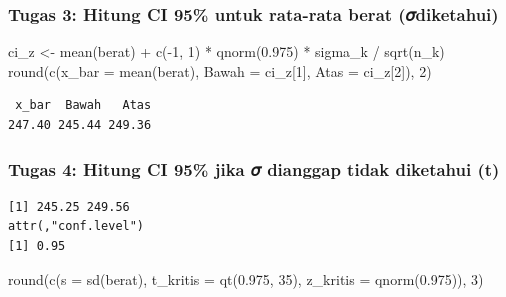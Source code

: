 \documentclass[
  indonesian,
  letterpaper,
]{book}
\newenvironment{Shaded}{\begin{snugshade}}{\end{snugshade}}
\newcommand{\AttributeTok}[1]{\textcolor[rgb]{0.40,0.45,0.13}{#1}}
\newcommand{\DecValTok}[1]{\textcolor[rgb]{0.68,0.00,0.00}{#1}}
\newcommand{\FloatTok}[1]{\textcolor[rgb]{0.68,0.00,0.00}{#1}}
\newcommand{\FunctionTok}[1]{\textcolor[rgb]{0.28,0.35,0.67}{#1}}
\newcommand{\NormalTok}[1]{\textcolor[rgb]{0.00,0.23,0.31}{#1}}
\newcommand{\OtherTok}[1]{\textcolor[rgb]{0.00,0.23,0.31}{#1}}
\newcommand{\SpecialCharTok}[1]{\textcolor[rgb]{0.37,0.37,0.37}{#1}}
\begin{document}
\subsubsection{Tugas 3: Hitung CI 95\% untuk rata-rata berat
(𝜎diketahui)}\label{tugas-3-hitung-ci-95-untuk-rata-rata-berat-ux1d70ediketahui}

\begin{Shaded}
\begin{Highlighting}[]
\NormalTok{ci\_z }\OtherTok{\textless{}{-}} \FunctionTok{mean}\NormalTok{(berat) }\SpecialCharTok{+} \FunctionTok{c}\NormalTok{(}\SpecialCharTok{{-}}\DecValTok{1}\NormalTok{, }\DecValTok{1}\NormalTok{) }\SpecialCharTok{*} \FunctionTok{qnorm}\NormalTok{(}\FloatTok{0.975}\NormalTok{) }\SpecialCharTok{*}\NormalTok{ sigma\_k }\SpecialCharTok{/} \FunctionTok{sqrt}\NormalTok{(n\_k)}
\FunctionTok{round}\NormalTok{(}\FunctionTok{c}\NormalTok{(}\AttributeTok{x\_bar =} \FunctionTok{mean}\NormalTok{(berat), }\AttributeTok{Bawah =}\NormalTok{ ci\_z[}\DecValTok{1}\NormalTok{], }\AttributeTok{Atas =}\NormalTok{ ci\_z[}\DecValTok{2}\NormalTok{]), }\DecValTok{2}\NormalTok{)}
\end{Highlighting}
\end{Shaded}

\begin{verbatim}
 x_bar  Bawah   Atas 
247.40 245.44 249.36 
\end{verbatim}

\subsubsection{Tugas 4: Hitung CI 95\% jika 𝜎 dianggap tidak diketahui
(t)}\label{tugas-4-hitung-ci-95-jika-ux1d70e-dianggap-tidak-diketahui-t}

\begin{Shaded}
\end{Shaded}

\begin{verbatim}
[1] 245.25 249.56
attr(,"conf.level")
[1] 0.95
\end{verbatim}

\begin{Shaded}
\begin{Highlighting}[]
\FunctionTok{round}\NormalTok{(}\FunctionTok{c}\NormalTok{(}\AttributeTok{s =} \FunctionTok{sd}\NormalTok{(berat), }\AttributeTok{t\_kritis =} \FunctionTok{qt}\NormalTok{(}\FloatTok{0.975}\NormalTok{, }\DecValTok{35}\NormalTok{), }\AttributeTok{z\_kritis =} \FunctionTok{qnorm}\NormalTok{(}\FloatTok{0.975}\NormalTok{)), }\DecValTok{3}\NormalTok{)}
\end{Highlighting}
\end{Shaded}
\end{document}
